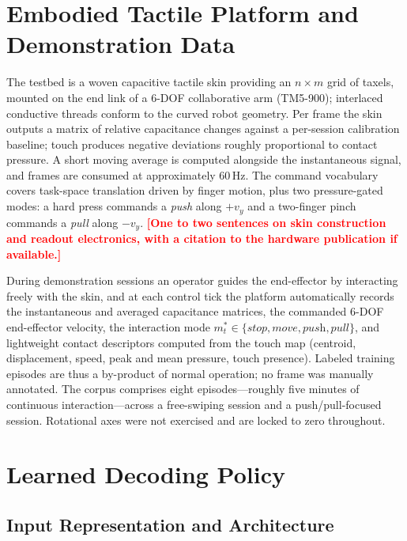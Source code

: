 \documentclass[runningheads]{llncs}
\newcommand{\TBD}[1]{\textcolor{red}{\textbf{[#1]}}}
\begin{document}
\section{Embodied Tactile Platform and Demonstration Data}
\label{sec:platform}

The testbed is a woven capacitive tactile skin providing an $n \times m$
grid of taxels, mounted on the end link of a 6-DOF collaborative arm
(TM5-900); interlaced conductive threads conform to the curved robot
geometry. Per frame the skin outputs a matrix of relative capacitance
changes against a per-session calibration baseline; touch produces
negative deviations roughly proportional to contact pressure. A short
moving average is computed alongside the instantaneous signal, and
frames are consumed at approximately 60\,Hz. The command vocabulary
covers task-space translation driven by finger motion, plus two
pressure-gated modes: a hard press commands a \emph{push} along $+v_y$
and a two-finger pinch commands a \emph{pull} along $-v_y$.
\TBD{One to two sentences on skin construction and readout electronics,
with a citation to the hardware publication if available.}

\label{sec:data}
During demonstration sessions an operator guides the end-effector by
interacting freely with the skin, and at each control tick the platform
automatically records the instantaneous and averaged capacitance
matrices, the commanded 6-DOF end-effector velocity, the interaction
mode $m_t^\ast \in \{\textit{stop}, \textit{move}, \textit{push},
\textit{pull}\}$, and lightweight contact descriptors computed from the
touch map (centroid, displacement, speed, peak and mean pressure, touch
presence). Labeled training episodes are thus a by-product of normal
operation; no frame was manually annotated. The corpus comprises eight
episodes---roughly five minutes of continuous interaction---across a
free-swiping session and a push/pull-focused session. Rotational axes
were not exercised and are locked to zero throughout.

\section{Learned Decoding Policy}
\label{sec:policy}

\subsection{Input Representation and Architecture}
\end{document}
